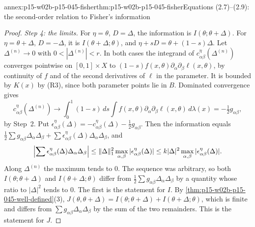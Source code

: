 \begin{annexitem}{annex:p15-w02b-p15-045-fisher}{thm:p15-w02b-p15-045-fisher}{Equations (2.7)--(2.9): the second-order relation to Fisher's information}
\begin{proof}
\emph{Step 4: the limits.} For \(\eta=\theta\), \(D=\Delta\), the
information is \(I(\theta;\theta+\Delta)\). For \(\eta=\theta+\Delta\),
\(D=-\Delta\), it is \(I(\theta+\Delta;\theta)\), and
\(\eta+sD=\theta+(1-s)\Delta\). Let \(\Delta^{(n)}\to0\) with
\(0<|\Delta^{(n)}|<r\). In both cases the integrand of
\(c^{\eta}_{\alpha\beta}(\Delta^{(n)})\) converges pointwise on
\([0,1]\times X\) to \((1-s)f(x,\theta)\partial_\alpha\partial_\beta\ell(x,\theta)\),
by continuity of \(f\) and of the second derivatives of \(\ell\) in the
parameter. It is bounded by \(K(x)\) by (R3), since both parameter
points lie in \(B\). Dominated convergence gives
\[
  c^{\eta}_{\alpha\beta}(\Delta^{(n)})\to\int_0^1(1-s)\,ds\int f(x,\theta)\partial_\alpha\partial_\beta\ell(x,\theta)\,d\lambda(x)=-\tfrac12g_{\alpha\beta},
\]
by Step~2. Put
\(\epsilon^\eta_{\alpha\beta}(\Delta)=-c^\eta_{\alpha\beta}(\Delta)-\tfrac12g_{\alpha\beta}\).
Then the information equals
\(\tfrac12\sum g_{\alpha\beta}\Delta_\alpha\Delta_\beta+\sum\epsilon^\eta_{\alpha\beta}(\Delta)\Delta_\alpha\Delta_\beta\),
and
\[
  \Bigl|\sum\epsilon^\eta_{\alpha\beta}(\Delta)\Delta_\alpha\Delta_\beta\Bigr|
  \leq\|\Delta\|_1^2\max_{\alpha,\beta}|\epsilon^\eta_{\alpha\beta}(\Delta)|
  \leq k|\Delta|^2\max_{\alpha,\beta}|\epsilon^\eta_{\alpha\beta}(\Delta)|.
\]
Along \(\Delta^{(n)}\) the maximum tends to \(0\). The sequence was
arbitrary, so both \(I(\theta;\theta+\Delta)\) and
\(I(\theta+\Delta;\theta)\) differ from
\(\tfrac12\sum g_{\alpha\beta}\Delta_\alpha\Delta_\beta\) by a quantity
whose ratio to \(|\Delta|^2\) tends to \(0\). The first is the
statement for \(I\). By \cref{thm:p15-w02b-p15-045-well-defined}(3),
\(J(\theta,\theta+\Delta)=I(\theta;\theta+\Delta)+I(\theta+\Delta;\theta)\),
which is finite and differs from \(\sum g_{\alpha\beta}\Delta_\alpha\Delta_\beta\)
by the sum of the two remainders. This is the statement for \(J\).
\end{proof}
\end{annexitem}


